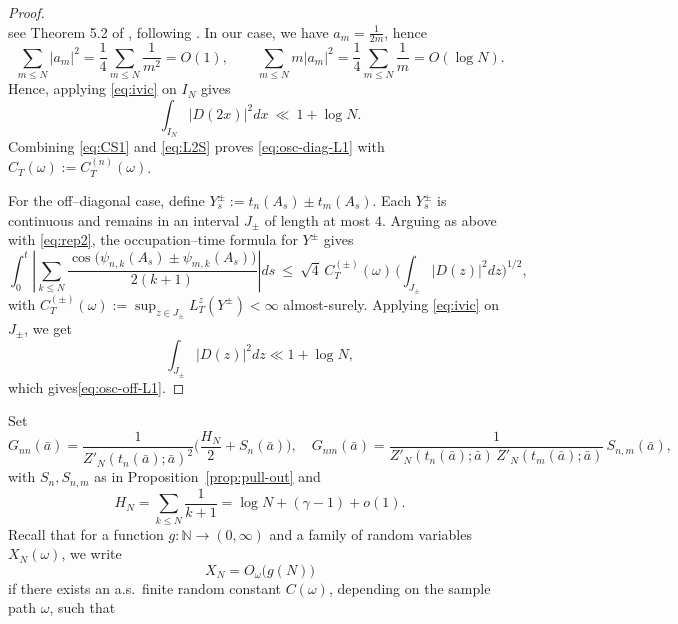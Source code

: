 \documentclass[12pt,reqno]{amsart}
\theoremstyle{plain}
\theoremstyle{definition}
\theoremstyle{remark}
\begin{document}
\begin{proof}
\begin{equation}
\end{equation}
see Theorem 5.2 of \cite{I2}, following \cite{MV,Ram}. 
In our case, we have $a_{m}=\frac{1}{2m}$, hence
\begin{equation}
\sum_{m \le N}|a_{m}|^2 = \frac{1}{4}\sum_{m \le N}\frac{1}{m^2}=O(1),
\qquad
\sum_{m \le N} m |a_{m}|^2=\frac{1}{4}\sum_{m\le N}\frac{1}{m}=O(\log N).
\end{equation}
Hence, applying \eqref{eq:ivic} on $I_N$ gives
\begin{equation}\label{eq:L2S}
\int_{I_N}|D(2x)|^2 dx \ \ll\ 1+\log N .
\end{equation}
Combining \eqref{eq:CS1} and \eqref{eq:L2S} proves \eqref{eq:osc-diag-L1} with
$C_T(\omega):=C_T^{(n)}(\omega)$.

For the off–diagonal case, define $Y_s^{\pm}:=t_n(A_s)\pm t_m(A_s)$. Each $Y_s^\pm$
is continuous and remains in an interval $J_\pm$ of length at most $4$.
Arguing as above with \eqref{eq:rep2}, the occupation–time formula for $Y^\pm$ gives 
\begin{equation}
\int_0^t \left|\sum_{k\le N}\frac{\cos\bigl(\psi_{n,k}(A_s)\pm\psi_{m,k}(A_s)\bigr)}{2(k+1)}\right| ds
\ \le\ \sqrt{4}\,C_T^{(\pm)}(\omega)\,\Big(\!\int_{J_\pm}|D(z)|^2 dz\Big)^{1/2},
\end{equation}
with $C_T^{(\pm)}(\omega):=\sup_{z\in J_\pm} L_T^z(Y^\pm)<\infty$ almost-surely.
Applying \eqref{eq:ivic} on $J_\pm$, we get
\begin{equation}
\int_{J_\pm}|D(z)|^2 dz\ll 1+\log N,
\end{equation} which gives\eqref{eq:osc-off-L1}.
\end{proof}
Set
\begin{equation}
\label{eq:Gnm}
G_{nn}(\bar{a})=\frac{1}{Z'_N(t_n(\bar{a});\bar{a})^2}\Big(\frac{H_N}{2}+S_n(\bar{a})\Big),\quad
G_{nm}(\bar{a})=\frac{1}{Z'_N(t_n(\bar{a});\bar{a})\,Z'_N(t_m(\bar{a});\bar{a})}\,S_{n,m}(\bar{a}),
\end{equation}
with $S_n,S_{n,m}$ as in Proposition~\ref{prop:pull-out} and
\begin{equation}
H_N=\sum_{k\le N}\frac1{k+1}=\log N+(\gamma-1)+o(1).
 \end{equation}
Recall that for a function $g:\mathbb{N}\to(0,\infty)$ and a family of random
variables $X_N(\omega)$, we write
\begin{equation}
X_N = O_\omega\!\big(g(N)\big)
\end{equation}
if there exists an a.s.\ finite random constant $C(\omega)$, depending on the
sample path $\omega$, such that
\end{document}
